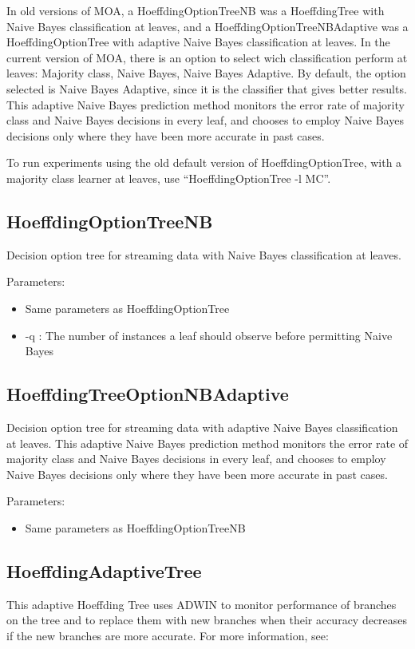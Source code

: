 \documentclass[a4paper,12pt,twoside]{book}
\begin{document}
In old versions of MOA, a HoeffdingOptionTreeNB was a HoeffdingTree with Naive Bayes classification at leaves,
and a HoeffdingOptionTreeNBAdaptive was a HoeffdingOptionTree with adaptive Naive Bayes classification at leaves.
In the current version of MOA, there is an option to select wich classification perform at leaves: 
Majority class, Naive Bayes, Naive Bayes Adaptive. By default, the option selected is 
Naive Bayes Adaptive, since it is the classifier that gives better results.
This adaptive Naive Bayes prediction method monitors
the error rate of majority class and Naive Bayes decisions in every
leaf, and chooses to employ Naive Bayes decisions only where they have been
more accurate in past cases.

To run experiments using the old default version of HoeffdingOptionTree, with a majority class learner at leaves, 
use ``HoeffdingOptionTree -l MC''. 
\BEGINOMIT
\subsection{HoeffdingOptionTreeNB} Decision option tree for streaming data with Naive Bayes classification at leaves.

Parameters:
\begin{itemize}
\item Same parameters as HoeffdingOptionTree
\item -q : The number of instances a leaf should observe before permitting Naive Bayes
\end{itemize}

\subsection{HoeffdingTreeOptionNBAdaptive} Decision option tree for streaming data with adaptive Naive Bayes classification at leaves.
This adaptive Naive Bayes prediction method monitors
the error rate of majority class and Naive Bayes decisions in every
leaf, and chooses to employ Naive Bayes decisions only where they have been
more accurate in past cases.

Parameters:
\begin{itemize}
\item Same parameters as HoeffdingOptionTreeNB
\end{itemize}
\ENDOMIT

\subsection{HoeffdingAdaptiveTree}
This adaptive Hoeffding Tree uses ADWIN to monitor performance of
  branches on the tree and to replace them with new branches when their
  accuracy decreases if the new branches are more accurate.
For more information, see:
\end{document}
